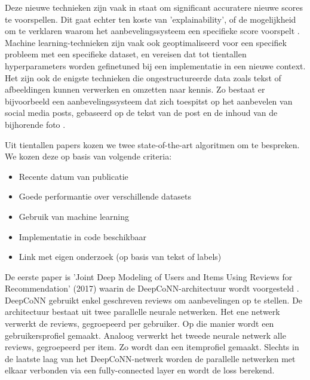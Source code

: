 
 Deze nieuwe technieken zijn vaak in staat om significant accuratere nieuwe scores te voorspellen. Dit gaat echter ten koste van 'explainability', of de mogelijkheid om te verklaren waarom het aanbevelingssysteem een specifieke score voorspelt \cite{overzicht_technieken}. Machine learning-technieken zijn vaak ook geoptimaliseerd voor een specifiek probleem met een specifieke dataset, en vereisen dat tot tientallen hyperparameters worden gefinetuned bij een implementatie in een nieuwe context. Het zijn ook de enigste technieken die ongestructureerde data zoals tekst of afbeeldingen kunnen verwerken en omzetten naar kennis. Zo bestaat er bijvoorbeeld een aanbevelingssysteem dat zich toespitst op het aanbevelen van social media posts, gebaseerd op de tekst van de post en de inhoud van de bijhorende foto \cite{recsys_afbeeldingen_social_network}.

 Uit tientallen papers kozen we twee state-of-the-art algoritmen om te bespreken. We kozen deze op basis van volgende criteria:
\begin{itemize}
     \item Recente datum van publicatie
     \item Goede performantie over verschillende datasets
     \item Gebruik van machine learning
     \item Implementatie in code beschikbaar
     \item Link met eigen onderzoek (op basis van tekst of labels)
\end{itemize}

De eerste paper is 'Joint Deep Modeling of Users and Items Using Reviews for Recommendation' (2017) waarin de DeepCoNN-architectuur wordt voorgesteld \cite{deepconn}. DeepCoNN gebruikt enkel geschreven reviews om aanbevelingen op te stellen. De architectuur bestaat uit twee parallelle neurale netwerken. Het ene netwerk verwerkt de reviews, gegroepeerd per gebruiker. Op die manier wordt een gebruikersprofiel gemaakt. Analoog verwerkt het tweede neurale netwerk alle reviews, gegroepeerd per item. Zo wordt dan een itemprofiel gemaakt. Slechts in de laatste laag van het DeepCoNN-netwerk worden de parallelle netwerken met elkaar verbonden via een fully-connected layer en wordt de loss berekend.


